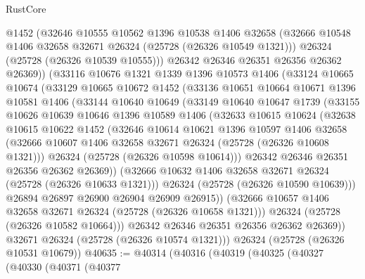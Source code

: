 \begin{lexlean}{RustCore}
\begin{coremodule}
        @1452
        (@32646
          @10555
          @10562
          @1396
          @10538
          @1406
          @32658
          (@32666 @10548 @1406 @32658 @32671 @26324 (@25728 (@26326 @10549 @1321)))
          @26324
          (@25728 (@26326 @10539 @10555)))
        @26342
        @26346
        @26351
        @26356
        @26362
        @26369))
    (@33116
      @10676
      @1321
      @1339
      @1396
      @10573
      @1406
      (@33124
        @10665
        @10674
        (@33129
          @10665
          @10672
          @1452
          (@33136
            @10651
            @10664
            @10671
            @1396
            @10581
            @1406
            (@33144
              @10640
              @10649
              (@33149
                @10640
                @10647
                @1739
                (@33155
                  @10626
                  @10639
                  @10646
                  @1396
                  @10589
                  @1406
                  (@32633
                    @10615
                    @10624
                    (@32638
                      @10615
                      @10622
                      @1452
                      (@32646
                        @10614
                        @10621
                        @1396
                        @10597
                        @1406
                        @32658
                        (@32666 @10607 @1406 @32658 @32671 @26324 (@25728 (@26326 @10608 @1321)))
                        @26324
                        (@25728 (@26326 @10598 @10614)))
                      @26342
                      @26346
                      @26351
                      @26356
                      @26362
                      @26369))
                  (@32666 @10632 @1406 @32658 @32671 @26324 (@25728 (@26326 @10633 @1321)))
                  @26324
                  (@25728 (@26326 @10590 @10639)))
                @26894
                @26897
                @26900
                @26904
                @26909
                @26915))
            (@32666 @10657 @1406 @32658 @32671 @26324 (@25728 (@26326 @10658 @1321)))
            @26324
            (@25728 (@26326 @10582 @10664)))
          @26342
          @26346
          @26351
          @26356
          @26362
          @26369))
      @32671
      @26324
      (@25728 (@26326 @10574 @1321)))
    @26324
    (@25728 (@26326 @10531 @10679))
@40635 := @40314
    (@40316
      (@40319
        (@40325
          (@40327
            (@40330
              (@40371
                (@40377

\end{coremodule}
\end{lexlean}
